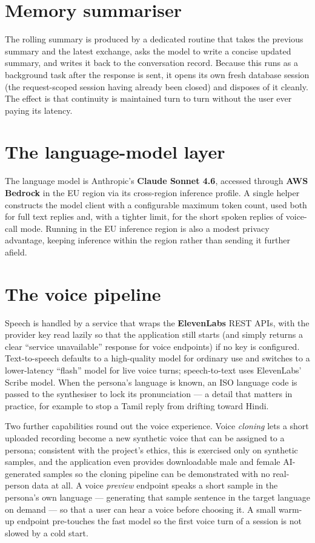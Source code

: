 \documentclass[11pt,a4paper]{report}
\begin{document}
\section{Memory summariser}
The rolling summary is produced by a dedicated routine that takes the previous summary and the latest exchange, asks the model to write a concise updated summary, and writes it back to the conversation record. Because this runs as a background task after the response is sent, it opens its own fresh database session (the request-scoped session having already been closed) and disposes of it cleanly. The effect is that continuity is maintained turn to turn without the user ever paying its latency.

\section{The language-model layer}
The language model is Anthropic's \textbf{Claude Sonnet 4.6}, accessed through \textbf{AWS Bedrock} in the EU region via its cross-region inference profile. A single helper constructs the model client with a configurable maximum token count, used both for full text replies and, with a tighter limit, for the short spoken replies of voice-call mode. Running in the EU inference region is also a modest privacy advantage, keeping inference within the region rather than sending it further afield.

\section{The voice pipeline}
Speech is handled by a service that wraps the \textbf{ElevenLabs} REST APIs, with the provider key read lazily so that the application still starts (and simply returns a clear ``service unavailable'' response for voice endpoints) if no key is configured. Text-to-speech defaults to a high-quality model for ordinary use and switches to a lower-latency ``flash'' model for live voice turns; speech-to-text uses ElevenLabs' Scribe model. When the persona's language is known, an ISO language code is passed to the synthesiser to lock its pronunciation --- a detail that matters in practice, for example to stop a Tamil reply from drifting toward Hindi.

Two further capabilities round out the voice experience. Voice \emph{cloning} lets a short uploaded recording become a new synthetic voice that can be assigned to a persona; consistent with the project's ethics, this is exercised only on synthetic samples, and the application even provides downloadable male and female AI-generated samples so the cloning pipeline can be demonstrated with no real-person data at all. A voice \emph{preview} endpoint speaks a short sample in the persona's own language --- generating that sample sentence in the target language on demand --- so that a user can hear a voice before choosing it. A small warm-up endpoint pre-touches the fast model so the first voice turn of a session is not slowed by a cold start.
\end{document}
